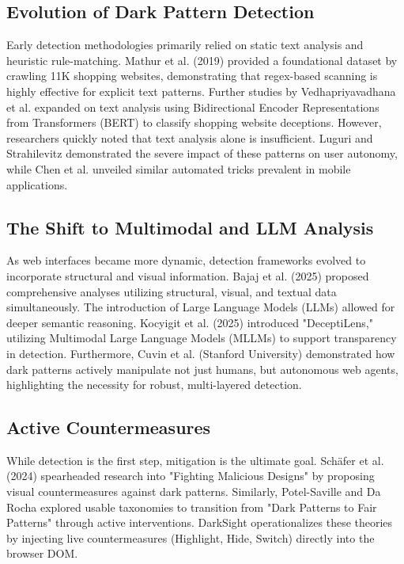 \documentclass[12pt,a4paper]{article}
\begin{document}
\subsection{Evolution of Dark Pattern Detection}
Early detection methodologies primarily relied on static text analysis and heuristic rule-matching. Mathur et al. (2019) \cite{mathur2019} provided a foundational dataset by crawling 11K shopping websites, demonstrating that regex-based scanning is highly effective for explicit text patterns. Further studies by Vedhapriyavadhana et al. \cite{vedha} expanded on text analysis using Bidirectional Encoder Representations from Transformers (BERT) to classify shopping website deceptions. However, researchers quickly noted that text analysis alone is insufficient. Luguri and Strahilevitz \cite{luguri} demonstrated the severe impact of these patterns on user autonomy, while Chen et al. \cite{chen} unveiled similar automated tricks prevalent in mobile applications.

\subsection{The Shift to Multimodal and LLM Analysis}
As web interfaces became more dynamic, detection frameworks evolved to incorporate structural and visual information. Bajaj et al. (2025) \cite{bajaj2025} proposed comprehensive analyses utilizing structural, visual, and textual data simultaneously. The introduction of Large Language Models (LLMs) allowed for deeper semantic reasoning. Kocyigit et al. (2025) \cite{kocyigit2025} introduced "DeceptiLens," utilizing Multimodal Large Language Models (MLLMs) to support transparency in detection. Furthermore, Cuvin et al. (Stanford University) \cite{cuvin} demonstrated how dark patterns actively manipulate not just humans, but autonomous web agents, highlighting the necessity for robust, multi-layered detection.

\subsection{Active Countermeasures}
While detection is the first step, mitigation is the ultimate goal. Schäfer et al. (2024) \cite{schaefer2024} spearheaded research into "Fighting Malicious Designs" by proposing visual countermeasures against dark patterns. Similarly, Potel-Saville and Da Rocha \cite{potel} explored usable taxonomies to transition from "Dark Patterns to Fair Patterns" through active interventions. DarkSight operationalizes these theories by injecting live countermeasures (Highlight, Hide, Switch) directly into the browser DOM.
\end{document}
